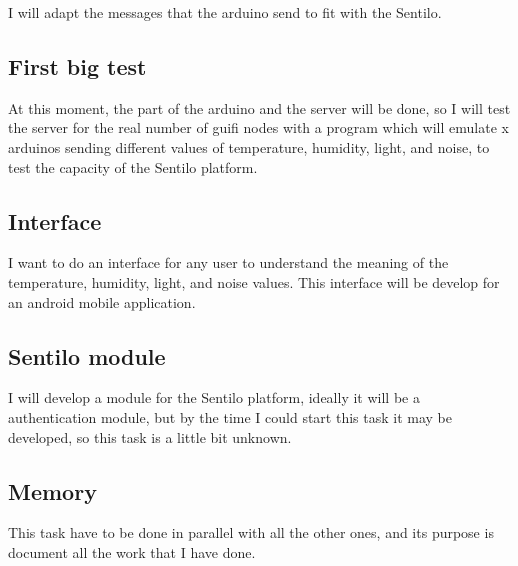 \documentclass[10pt,a4paper]{article}
\begin{document}
I will adapt the messages that the arduino send to fit with the Sentilo.

\subsection{First big test}

At this moment, the part of the arduino and the server will be done, so I will test the server for the real number of guifi nodes with a program which will emulate x arduinos sending different values of temperature, humidity, light, and noise, to test the capacity of the Sentilo platform.

\subsection{Interface}

I want to do an interface for any user to understand the meaning of the temperature, humidity, light, and noise values. This interface will be develop for an android mobile application.

\subsection{Sentilo module}

I will develop a module for the Sentilo platform, ideally it will be a authentication module, but by the time I could start this task it may be developed, so this task is a little bit unknown.

\subsection{Memory}

This task have to be done in parallel with all the other ones, and its purpose is document all the work that I have done.
\end{document}
